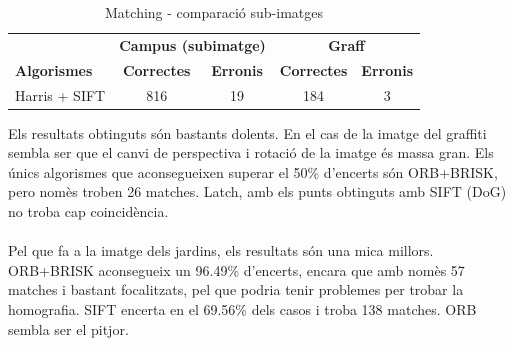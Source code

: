 		\begin{table}[H]
			\begin{center}
				\begin{tabular}{l | c c | c c}
					& \multicolumn{2}{c|}{\textbf{Campus (subimatge)}} & \multicolumn{2}{c}{\textbf{Graff}} \\
					\textbf{Algorismes} & \textbf{Correctes} & \textbf{Erronis} & \textbf{Correctes} & \textbf{Erronis} \\ \hline
					Harris + SIFT & 816 & 19 & 184 & 3 \\
				\end{tabular}
			\end{center}
			\caption{Matching - comparació sub-imatges}
		\end{table}

		\noindent
		Els resultats obtinguts són bastants dolents. En el cas de la imatge del graffiti sembla ser que el canvi de perspectiva i rotació de la imatge és massa gran.
		Els únics algorismes que aconsegueixen superar el 50\% d'encerts són ORB+BRISK, pero nomès troben 26 matches. Latch, amb els punts obtinguts amb SIFT (DoG) no troba cap coincidència.\\\\
		Pel que fa a la imatge dels jardins, els resultats són una mica millors. ORB+BRISK aconsegueix un 96.49\% d'encerts, encara que amb nomès 57 matches i bastant focalitzats, pel que podria tenir
		problemes per trobar la homografia. SIFT encerta en el 69.56\% dels casos i troba 138 matches. ORB sembla ser el pitjor.\\

